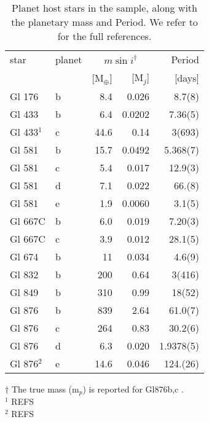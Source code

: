 \documentclass[structabstract]{aa}
\begin{document}

\begin{table}[h]
\centering
\caption{Planet host stars in the sample, along with the planetary mass and Period. We refer to \citet{Bonfils-2011} for the full references.}
\label{planets}
\begin{center}
\begin{tabular}{l l r r r }

\hline
\hline
star & planet & \multicolumn{2}{c}{$m\sin{i}^{\dag}$} & Period \\
     &        &  [M$_{\oplus}$] & [M$_{j}$]     & [days] \\
\hline
Gl 176 & b &  8.4 & 0.026 &  8.7(8) \\
Gl 433 & b &  6.4 & 0.0202 &  7.36(5) \\
Gl 433$^{1}$ & c & 44.6 & 0.14 & 3(693) \\
Gl 581 & b & 15.7 & 0.0492 &  5.368(7)\\
Gl 581 & c &  5.4 & 0.017 & 12.9(3) \\
Gl 581 & d &  7.1 & 0.022 & 66.(8) \\
Gl 581 & e &  1.9 & 0.0060 &  3.1(5) \\
Gl 667C & b &  6.0 & 0.019 &  7.20(3) \\
Gl 667C & c &  3.9 & 0.012 & 28.1(5) \\
Gl 674 & b & 11 & 0.034 &  4.6(9) \\
Gl 832 & b & 200 & 0.64 & 3(416) \\
Gl 849 & b & 310 & 0.99 & 18(52) \\
Gl 876 & b & 839 & 2.64 & 61.0(7) \\
Gl 876 & c & 264 & 0.83 & 30.2(6) \\
Gl 876 & d &  6.3 & 0.020 &  1.9378(5) \\
Gl 876$^{2}$ & e & 14.6 & 0.046 & 124.(26) \\
\hline
\hline
\end{tabular}
\end{center}
\raggedright
$\dag$ The true mass (m$_{p}$) is reported for Gl876b,c \citep{Correia-2010}. \\
$^{1}$ REFS\\
$^{2}$ REFS 
\end{table}
\end{document}
